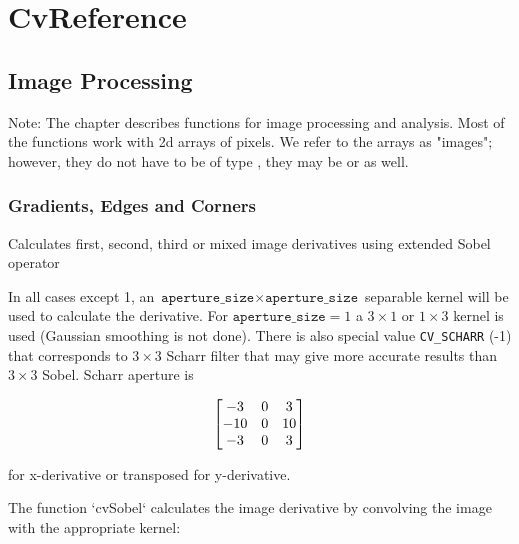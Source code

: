 \chapter{CvReference}
\section{Image Processing}

Note: The chapter describes functions for image processing and
analysis. Most of the functions work with 2d arrays of pixels. We refer
to the arrays as "images"; however, they do not have to be of type
, they may be  or  as well.

\subsection{Gradients, Edges and Corners}

\label{Sobel}
\label{Sobel}
Calculates first, second, third or mixed image derivatives using extended Sobel operator

\begin{description}
\end{description}

In all cases except 1, an $\texttt{aperture\_size} \times
\texttt{aperture\_size}$ separable kernel will be used to calculate the
derivative. For $\texttt{aperture\_size} = 1$ a $ 3 \times 1$ or $ 1 \times 3$
kernel is used (Gaussian smoothing is not done). There is also special
value \texttt{CV\_SCHARR} (-1) that corresponds to $3\times3$ Scharr
filter that may give more accurate results than $3\times3$ Sobel. Scharr
aperture is

\[ \begin{bmatrix} -3 & 0 & 3\\ -10 & 0 & 10\\ -3 & 0 & 3 \end{bmatrix}
\]

for x-derivative or transposed for y-derivative.

The function `cvSobel` calculates the image derivative by convolving the image with the appropriate kernel:


